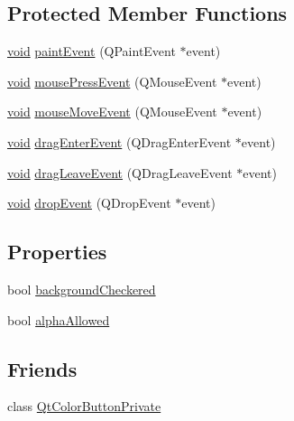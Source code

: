 \subsection*{\-Protected \-Member \-Functions}
\begin{DoxyCompactItemize}
\item 
\hyperlink{group___u_a_v_objects_plugin_ga444cf2ff3f0ecbe028adce838d373f5c}{void} \hyperlink{class_utils_1_1_qt_color_button_a4d57edad63b440e0c4340ae4d0a4e5a9}{paint\-Event} (\-Q\-Paint\-Event $\ast$event)
\item 
\hyperlink{group___u_a_v_objects_plugin_ga444cf2ff3f0ecbe028adce838d373f5c}{void} \hyperlink{class_utils_1_1_qt_color_button_a22626f485585fc56fb1029419477827c}{mouse\-Press\-Event} (\-Q\-Mouse\-Event $\ast$event)
\item 
\hyperlink{group___u_a_v_objects_plugin_ga444cf2ff3f0ecbe028adce838d373f5c}{void} \hyperlink{class_utils_1_1_qt_color_button_aae270f713e7f84edb22a242c0fbdd10a}{mouse\-Move\-Event} (\-Q\-Mouse\-Event $\ast$event)
\item 
\hyperlink{group___u_a_v_objects_plugin_ga444cf2ff3f0ecbe028adce838d373f5c}{void} \hyperlink{class_utils_1_1_qt_color_button_a1f3cb44275edffe11e2b136baf0d27a8}{drag\-Enter\-Event} (\-Q\-Drag\-Enter\-Event $\ast$event)
\item 
\hyperlink{group___u_a_v_objects_plugin_ga444cf2ff3f0ecbe028adce838d373f5c}{void} \hyperlink{class_utils_1_1_qt_color_button_a7f3790f8da51462c3423b2a616e6443a}{drag\-Leave\-Event} (\-Q\-Drag\-Leave\-Event $\ast$event)
\item 
\hyperlink{group___u_a_v_objects_plugin_ga444cf2ff3f0ecbe028adce838d373f5c}{void} \hyperlink{class_utils_1_1_qt_color_button_a3e64a393badb53d187af1ac4a434e84d}{drop\-Event} (\-Q\-Drop\-Event $\ast$event)
\end{DoxyCompactItemize}
\subsection*{\-Properties}
\begin{DoxyCompactItemize}
\item 
bool \hyperlink{class_utils_1_1_qt_color_button_a4610a035893dd4f90c4ce55ac5a91592}{background\-Checkered}
\item 
bool \hyperlink{class_utils_1_1_qt_color_button_af68962155cd42dcaab96298d8222c072}{alpha\-Allowed}
\end{DoxyCompactItemize}
\subsection*{\-Friends}
\begin{DoxyCompactItemize}
\item 
class \hyperlink{class_utils_1_1_qt_color_button_a970ea14fbbc3cf7428513109a42a7e2e}{\-Qt\-Color\-Button\-Private}
\end{DoxyCompactItemize}


